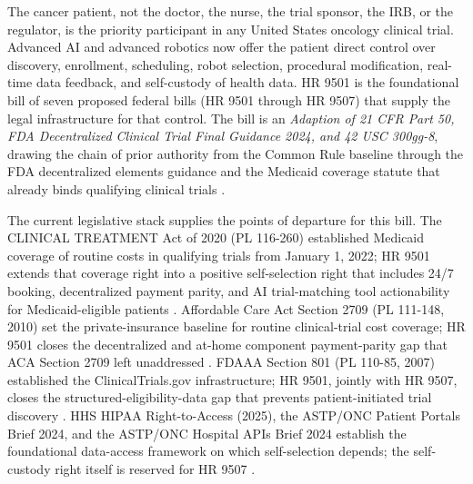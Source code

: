 %

\hspace{0.5cm} The cancer patient, not the doctor, the nurse, the trial sponsor, the
IRB, or the regulator, is the priority participant in any United
States oncology clinical trial. Advanced AI and advanced robotics now
offer the patient direct control over discovery, enrollment,
scheduling, robot selection, procedural modification, real-time data
feedback, and self-custody of health data. HR 9501 is the foundational
bill of seven proposed federal bills (HR 9501 through HR 9507) that
supply the legal infrastructure for that control. The bill is an
\textit{Adaption of 21 CFR Part 50, FDA Decentralized Clinical Trial
Final Guidance 2024, and 42 USC 300gg-8}, drawing the chain of prior
authority from the Common Rule baseline through the FDA decentralized
elements guidance and the Medicaid coverage statute that already binds
qualifying clinical trials \cite{hhs_45cfr46_protection_human_subjects,
fda_dct_guidance_2024, fda_oce_advancing_oncology_dct_2024,
usc_300gg8_clinical_trials, kawchak_2026_19994945,
kawchak_2026_19119939, kawchak_2026_20045457}.

The current legislative stack supplies the points of departure for
this bill. The CLINICAL TREATMENT Act of 2020 (PL 116-260) established
Medicaid coverage of routine costs in qualifying trials from January
1, 2022; HR 9501 extends that coverage right into a positive
self-selection right that includes 24/7 booking, decentralized payment
parity, and AI trial-matching tool actionability for Medicaid-eligible
patients \cite{rank2_clinical_treatment_act_2020, jin2024trialgpt,
gupta2024prism, abdallah2026trialmatchai}. Affordable Care Act Section
2709 (PL 111-148, 2010) set the private-insurance baseline for routine
clinical-trial cost coverage; HR 9501 closes the decentralized and
at-home component payment-parity gap that ACA Section 2709 left
unaddressed \cite{rank3_aca_clinical_trials_2010,
usc_300gg8_clinical_trials}. FDAAA Section 801 (PL 110-85, 2007)
established the ClinicalTrials.gov infrastructure; HR 9501, jointly
with HR 9507, closes the structured-eligibility-data gap that prevents
patient-initiated trial discovery \cite{rank5_fdaaa_2007}. HHS HIPAA
Right-to-Access (2025), the ASTP/ONC Patient Portals Brief 2024, and
the ASTP/ONC Hospital APIs Brief 2024 establish the foundational
data-access framework on which self-selection depends; the self-
custody right itself is reserved for HR 9507
\cite{hhs_right_to_access_2025, astp_onc_patient_portals_apps_2024,
astp_onc_hospital_apis_2024}.

